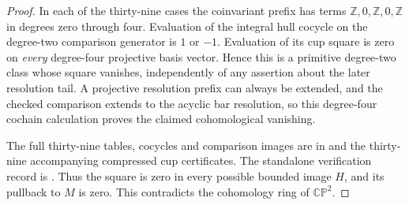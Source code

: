 \begin{proof}
In each of the thirty-nine cases the coinvariant prefix has
terms $\mathbb Z,0,\mathbb Z,0,\mathbb Z$ in degrees zero
through four.  Evaluation of the integral hull cocycle on the
degree-two comparison generator is $1$ or $-1$.  Evaluation
of its cup square is zero on \emph{every} degree-four
projective basis vector.  Hence this is a primitive
degree-two class whose square vanishes, independently of
any assertion about the later resolution tail.  A projective
resolution prefix can always be extended, and the checked
comparison extends to the acyclic bar resolution, so this
degree-four cochain calculation proves the claimed
cohomological vanishing.

The full thirty-nine tables, cocycles and comparison images are
in  and the
thirty-nine accompanying compressed cup certificates.  The
standalone verification record is
.
Thus the square is zero in every possible bounded image $H$,
and its pullback to $M$ is zero.  This contradicts the
cohomology ring of $\mathbb{CP}^2$.
\end{proof}
